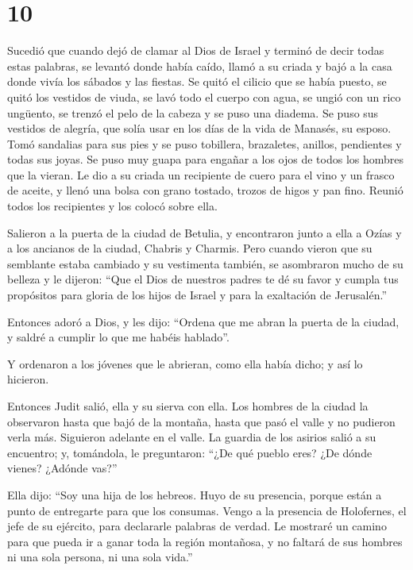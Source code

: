 \hypertarget{section-9}{%
\section{10}\label{section-9}}

 Sucedió que cuando dejó de clamar al Dios de Israel y
terminó de decir todas estas palabras,  se levantó donde
había caído, llamó a su criada y bajó a la casa donde vivía los sábados
y las fiestas.  Se quitó el cilicio que se había puesto,
se quitó los vestidos de viuda, se lavó todo el cuerpo con agua, se
ungió con un rico ungüento, se trenzó el pelo de la cabeza y se puso una
diadema. Se puso sus vestidos de alegría, que solía usar en los días de
la vida de Manasés, su esposo.  Tomó sandalias para sus
pies y se puso tobillera, brazaletes, anillos, pendientes y todas sus
joyas. Se puso muy guapa para engañar a los ojos de todos los hombres
que la vieran.  Le dio a su criada un recipiente de cuero
para el vino y un frasco de aceite, y llenó una bolsa con grano tostado,
trozos de higos y pan fino. Reunió todos los recipientes y los colocó
sobre ella.

 Salieron a la puerta de la ciudad de Betulia, y
encontraron junto a ella a Ozías y a los ancianos de la ciudad, Chabris
y Charmis.  Pero cuando vieron que su semblante estaba
cambiado y su vestimenta también, se asombraron mucho de su belleza y le
dijeron:  ``Que el Dios de nuestros padres te dé su favor
y cumpla tus propósitos para gloria de los hijos de Israel y para la
exaltación de Jerusalén.''

Entonces adoró a Dios,  y les dijo: ``Ordena que me abran
la puerta de la ciudad, y saldré a cumplir lo que me habéis hablado''.

Y ordenaron a los jóvenes que le abrieran, como ella había dicho;
 y así lo hicieron.

Entonces Judit salió, ella y su sierva con ella. Los hombres de la
ciudad la observaron hasta que bajó de la montaña, hasta que pasó el
valle y no pudieron verla más.  Siguieron adelante en el
valle. La guardia de los asirios salió a su encuentro; 
y, tomándola, le preguntaron: ``¿De qué pueblo eres? ¿De dónde vienes?
¿Adónde vas?''

Ella dijo: ``Soy una hija de los hebreos. Huyo de su presencia, porque
están a punto de entregarte para que los consumas.  Vengo
a la presencia de Holofernes, el jefe de su ejército, para declararle
palabras de verdad. Le mostraré un camino para que pueda ir a ganar toda
la región montañosa, y no faltará de sus hombres ni una sola persona, ni
una sola vida.''

